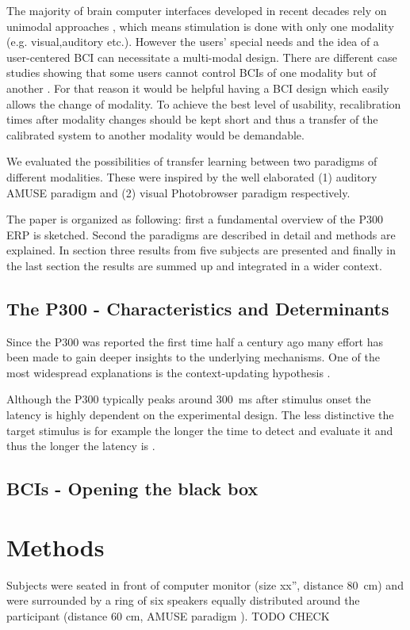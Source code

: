 \documentclass[10pt,letterpaper]{article}
\begin{document}
The majority of brain computer interfaces developed in recent decades rely on unimodal approaches \cite{Wolpaw_2012}, which means stimulation is done with only one modality (e.g. visual,auditory etc.).
However the users' special needs and the idea of a user-centered BCI can necessitate a multi-modal design.
There are different case studies showing that some users cannot control BCIs of one modality but of another \cite{Schreuder_2013, Kaufmann_2013}.
For that reason it would be helpful having a BCI design which easily allows the change of modality.
To achieve the best level of usability, recalibration times after modality changes should be kept short and thus a transfer of the calibrated system to another modality would be demandable. 

We evaluated the possibilities of transfer learning between two paradigms of different modalities.
These were inspired by the well elaborated (1) auditory AMUSE paradigm \cite{Schreuder_2010, Schreuder_2011} and (2) visual Photobrowser paradigm \cite{Tangermann_2011,Quek_2012} respectively.

The paper is organized as following: first a fundamental overview of the P300 ERP is sketched.
Second the paradigms are described in detail and methods are explained.
In section three results from five subjects are presented and finally in the last section the results are summed up and integrated in a wider context.

\subsection{The P300 - Characteristics and Determinants}
Since the P300 was reported the first time half a century ago many effort has been made to gain deeper insights to the underlying mechanisms.
One of the most widespread explanations is the context-updating hypothesis \cite{Donchin_1988,Polich_2007}.

Although the P300 typically peaks around 300~ms after stimulus onset the latency is highly dependent on the experimental design.
The less distinctive the target stimulus is for example the longer the time to detect and evaluate it and thus the longer the latency is \cite{Polich_2007}.


\subsection{BCIs - Opening the black box}
\section{Methods}
Subjects were seated in front of computer monitor (size xx'', distance 80\ cm) and were surrounded by a ring of six speakers equally distributed around the participant (distance 60 cm, AMUSE paradigm \cite{Schreuder_2010}). TODO CHECK 
\end{document}
